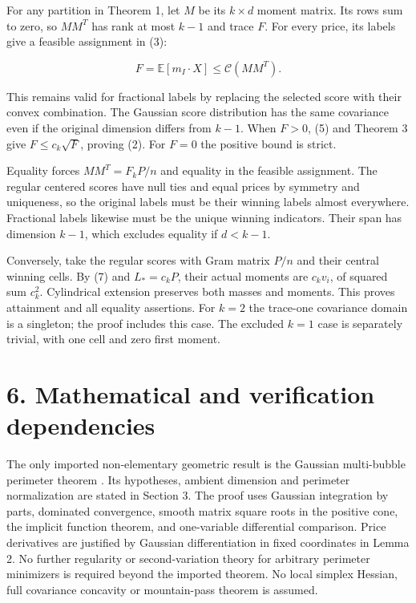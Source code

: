 \documentclass[11pt]{article}
\begin{document}
For any partition in Theorem 1, let \(M\) be its \(k\times d\) moment
matrix. Its rows sum to zero, so \(MM^T\) has rank at most \(k-1\) and
trace \(F\). For every price, its labels give a feasible assignment in
(3):

\[
 F=\mathbb E[m_I\cdot X]\le\mathcal C(MM^T).
\]

This remains valid for fractional labels by replacing the selected score
with their convex combination. The Gaussian score distribution has the
same covariance even if the original dimension differs from \(k-1\).
When \(F>0\), (5) and Theorem 3 give \(F\le c_k\sqrt F\), proving (2).
For \(F=0\) the positive bound is strict.

Equality forces \(MM^T=F_kP/n\) and equality in the feasible assignment.
The regular centered scores have null ties and equal prices by symmetry
and uniqueness, so the original labels must be their winning labels
almost everywhere. Fractional labels likewise must be the unique winning
indicators. Their span has dimension \(k-1\), which excludes equality if
\(d<k-1\).

Conversely, take the regular scores with Gram matrix \(P/n\) and their
central winning cells. By (7) and \(L_*=c_kP\), their actual moments are
\(c_kv_i\), of squared sum \(c_k^2\). Cylindrical extension preserves
both masses and moments. This proves attainment and all equality
assertions. For \(k=2\) the trace-one covariance domain is a singleton;
the proof includes this case. The excluded \(k=1\) case is separately
trivial, with one cell and zero first moment.

\section{6. Mathematical and verification
dependencies}\label{mathematical-and-verification-dependencies}

The only imported non-elementary geometric result is the Gaussian
multi-bubble perimeter theorem \cite{MN22}. Its hypotheses, ambient
dimension and perimeter normalization are stated in Section 3. The proof
uses Gaussian integration by parts, dominated convergence, smooth matrix
square roots in the positive cone, the implicit function theorem, and
one-variable differential comparison. Price derivatives are justified by
Gaussian differentiation in fixed coordinates in Lemma 2. No further
regularity or second-variation theory for arbitrary perimeter minimizers
is required beyond the imported theorem. No local simplex Hessian, full
covariance concavity or mountain-pass theorem is assumed.
\end{document}
